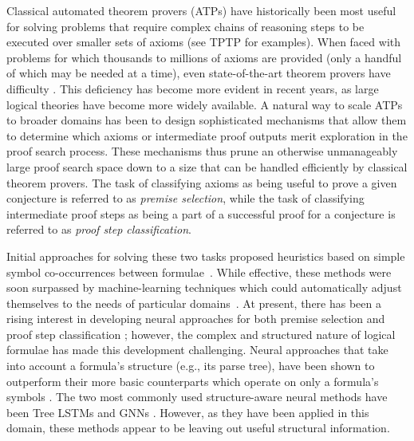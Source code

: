 \documentclass{article}
\begin{document}
Classical automated theorem provers (ATPs) have historically been most useful for solving problems that require complex chains of reasoning steps to be executed over smaller sets of axioms (see TPTP \cite{sutcliffe2009tptp} for examples). When faced with problems for which thousands to millions of axioms are provided (only a handful of which may be needed at a time), even state-of-the-art theorem provers have difficulty \cite{ramachandran2005first,hoder2011sine}. This deficiency has become more evident in recent years, as large logical theories
\cite{matuszek2006introduction,mizar40for40,pease2002suggested} have become more widely available. A natural way to scale ATPs to broader domains has been to design sophisticated mechanisms that allow them to determine which axioms or intermediate proof outputs merit exploration in the proof search process. These mechanisms thus prune an otherwise unmanageably large proof search space down to a size that can be handled efficiently by classical theorem provers. 
The task of classifying axioms as being useful to prove a given conjecture is referred to as \emph{premise selection}, while the task of classifying intermediate proof steps as being a part of a successful proof for a conjecture is referred to as \emph{proof step classification}. 

Initial approaches for solving these two tasks proposed heuristics based on simple symbol co-occurrences between formulae~\cite{hoder2011sine,roederer2009divvy,kuhlwein2012overview}. While effective, these methods were soon surpassed by machine-learning techniques which could automatically adjust themselves to the needs of particular domains~\cite{alama2014premise,irving2016deepmath}. At present, there has been a rising interest in developing neural approaches for both premise selection and proof step classification \cite{bansal2019holist,kaliszyk2017holstep,loos2017deep}; however, the complex and structured nature of logical formulae has made this development challenging.
Neural approaches that take into account a formula's structure (e.g., its parse tree), have been shown to outperform their more basic counterparts which operate on only a formula's symbols \cite{wang2017premise,paliwal2019graph}. The two most commonly used structure-aware neural methods have been Tree LSTMs \cite{tai2015improved} and GNNs \cite{kipf2016semi}. However, as they have been applied in this domain, these methods appear to be leaving out useful structural information.
\end{document}
